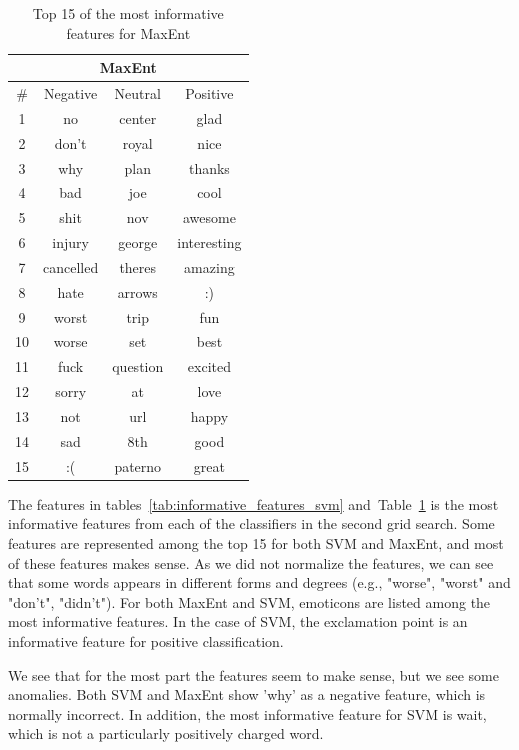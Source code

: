 \begin{table}[!htb]
	\centering
	\begin{tabular}{|c|c|c|c|}		
	\multicolumn{4}{c}{MaxEnt} \\ \hline
	
	\# & Negative & Neutral & Positive \\ \hline\hline
	
	1 & no 	& center & glad \\ \hline
	2 & don't 	& royal & nice \\ \hline
	3 & why 	& plan & thanks \\ \hline
	4 & bad 	& joe & cool \\ \hline
	5 & shit 	& nov & awesome \\ \hline
	6 & injury 	& george & interesting \\ \hline
	7 & cancelled 	& theres & amazing \\ \hline
	8 & hate 	& arrows & :) \\ \hline
	9 & worst 	& trip & fun \\ \hline
	10 & worse 	& set & best \\ \hline
	11 & fuck 	& question & excited \\ \hline
	12 & sorry 	& at & love \\ \hline
	13 & not 	& url & happy \\ \hline
	14 & sad 	& 8th & good \\ \hline
	15 & :( 	& paterno & great \\ \hline
	\end{tabular}
	
	\caption[Most informative features]{Top 15 of the most informative features for MaxEnt}
	\label{tab:informative_features_maxent}
\end{table}


The features in tables~\ref{tab:informative_features_svm} and~Table~\ref{tab:informative_features_maxent}  is the most informative features from each of the classifiers in the second grid search. Some features are represented among the top 15 for both SVM and MaxEnt, and most of these features makes sense. As we did not normalize the features, we can see that some words appears in different forms and degrees (e.g., "worse", "worst" and "don't", "didn't"). For both MaxEnt and SVM, emoticons are listed among the most informative features. In the case of SVM, the exclamation point is an informative feature for positive classification.

We see that for the most part the features seem to make sense, but we see some anomalies. Both SVM and MaxEnt show 'why' as a negative feature, which is normally incorrect. In addition, the most informative feature for SVM is wait, which is not a particularly positively charged word.


